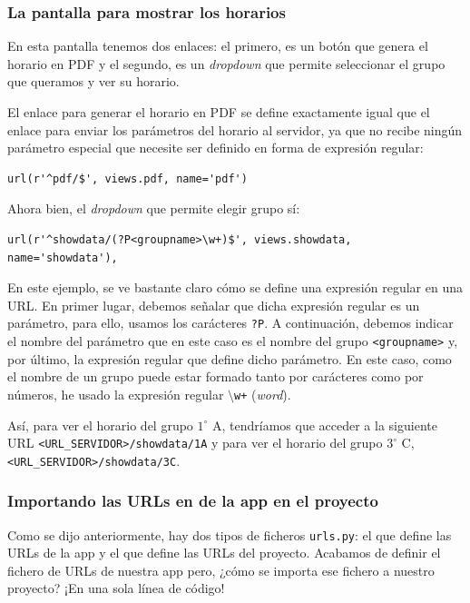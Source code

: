 \subsubsection{La pantalla para mostrar los horarios}
En esta pantalla tenemos dos enlaces: el primero, es un botón que genera el horario en PDF y el segundo, es un \textit{dropdown} que permite seleccionar el grupo que queramos y ver su horario.

El enlace para generar el horario en PDF se define exactamente igual que el enlace para enviar los parámetros del horario al servidor, ya que no recibe ningún parámetro especial que necesite ser definido en forma de expresión regular:

\begin{verbatim}
url(r'^pdf/$', views.pdf, name='pdf')
\end{verbatim}

Ahora bien, el \textit{dropdown} que permite elegir grupo sí: 

\begin{verbatim}
url(r'^showdata/(?P<groupname>\w+)$', views.showdata, name='showdata'),
\end{verbatim}

En este ejemplo, se ve bastante claro cómo se define una expresión regular en una URL. En primer lugar, debemos señalar que dicha expresión regular es un parámetro, para ello, usamos los carácteres \texttt{?P}. A continuación, debemos indicar el nombre del parámetro que en este caso es el nombre del grupo \texttt{<groupname>} y, por último, la expresión regular que define dicho parámetro. En este caso, como el nombre de un grupo puede estar formado tanto por carácteres como por números, he usado la expresión regular \texttt{$\setminus$w+} (\textit{word}). 

Así, para ver el horario del grupo $1^{\circ}$ A, tendríamos que acceder a la siguiente URL \texttt{<URL\_SERVIDOR>/showdata/1A} y para ver el horario del grupo $3^{\circ}$ C, \texttt{<URL\_SERVIDOR>/showdata/3C}.

\subsubsection{Importando las URLs en de la app en el proyecto}
Como se dijo anteriormente, hay dos tipos de ficheros \texttt{urls.py}: el que define las URLs de la app y el que define las URLs del proyecto. Acabamos de definir el fichero de URLs de nuestra app pero, ¿cómo se importa ese fichero a nuestro proyecto? ¡En una sola línea de código!


